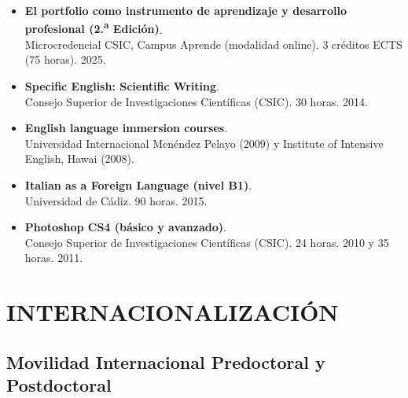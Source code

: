 \documentclass[11pt,a4paper]{article}
\begin{document}
\begin{itemize}[leftmargin=*]
    \item \textbf{El portfolio como instrumento de aprendizaje y desarrollo profesional (2.\textsuperscript{a} Edición)}.\\
    Microcredencial CSIC, Campus Aprende (modalidad online). 3 créditos ECTS (75 horas). 2025.

    \item \textbf{Specific English: Scientific Writing}.\\
    Consejo Superior de Investigaciones Científicas (CSIC). 30 horas. 2014.

    \item \textbf{English language immersion courses}.\\
    Universidad Internacional Menéndez Pelayo (2009) y Institute of Intensive English, Hawai (2008).

    \item \textbf{Italian as a Foreign Language (nivel B1)}.\\
    Universidad de Cádiz. 90 horas. 2015.

    \item \textbf{Photoshop CS4 (básico y avanzado)}.\\
    Consejo Superior de Investigaciones Científicas (CSIC). 24 horas. 2010 y 35 horas. 2011.
\end{itemize}


\newpage


\section{INTERNACIONALIZACIÓN}

\subsection{Movilidad Internacional Predoctoral y Postdoctoral}
\end{document}
